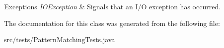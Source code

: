 \begin{DoxyExceptions}{Exceptions}
{\em I\+O\+Exception} & Signals that an I/O exception has occurred. \\
\hline
\end{DoxyExceptions}


The documentation for this class was generated from the following file\+:\begin{DoxyCompactItemize}
\item 
src/tests/Pattern\+Matching\+Tests.\+java\end{DoxyCompactItemize}
